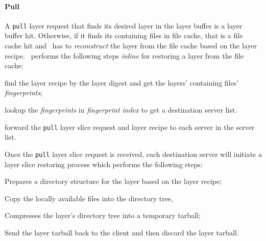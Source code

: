 %
%
%

\paragraph{Pull}
A \texttt{pull} layer request that finds its desired layer in the layer buffer is a layer buffer hit. 
Otherwise, if it finds its containing files in file cache, that is a file cache hit and
 \sysname~has to \emph{reconstruct} the layer from the file cache based on the layer recipe.
%
%
\sysname\ performs the following steps \emph{inline} for restoring a layer from the file cache:

\begin{compactenumerate}
	\item find the layer recipe by the layer digest and get the layers' containing files' \emph{fingerprints};
	\item lookup the \emph{fingerprints} in \emph{fingerprint index} to get a destination server list.
	\item forward the \texttt{pull} layer slice request and layer recipe to each server in the server list.
\end{compactenumerate}

Once the \texttt{pull} layer slice request is received, each destination server will initiate a layer slice restoring process 
which performs the following steps: 

\begin{compactenumerate}
	\item Prepares a directory structure for the layer based on the layer recipe;
	\item Copy the locally available files into the directory tree, 
	\item Compresses the layer's directory tree into a temporary tarball;
	\item Send the layer tarball back to the client and then discard the layer tarball.
\end{compactenumerate}

